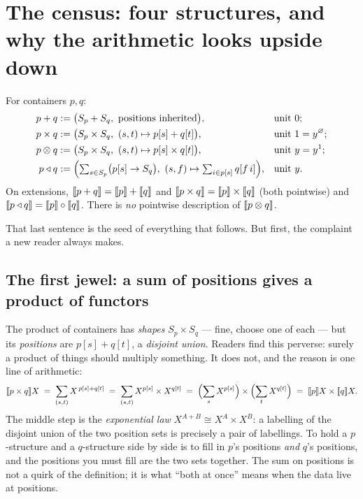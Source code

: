 \section{The census: four structures, and why the arithmetic looks upside down}
\label{sec:census}

\begin{Definition}\label{def:four}
For containers $p,q$:
\begin{align*}
 p + q &:= \bigl(S_p + S_q,\ \text{positions inherited}\bigr),
   &&\text{unit } 0;\\
 p\times q &:= \bigl(S_p\times S_q,\ (s,t)\mapsto p[s] + q[t]\bigr),
   &&\text{unit } 1 = y^{\varnothing};\\
 p\mathbin{\otimes} q &:= \bigl(S_p\times S_q,\ (s,t)\mapsto p[s]\times q[t]\bigr),
   &&\text{unit } y = y^{1};\\
 p\mathbin{\triangleleft} q &:= \Bigl(\textstyle\sum_{s\in S_p}\bigl(p[s]\to S_q\bigr),\
   (s,f)\mapsto \textstyle\sum_{i\in p[s]} q[f\,i]\Bigr),
   &&\text{unit } y .
\end{align*}
On extensions, $\llbracket p+q \rrbracket=\llbracket p \rrbracket+\llbracket q \rrbracket$ and $\llbracket p\times q \rrbracket=\llbracket p \rrbracket\times\llbracket q \rrbracket$
(both pointwise) and $\llbracket p\mathbin{\triangleleft} q \rrbracket=\llbracket p \rrbracket\circ\llbracket q \rrbracket$. There is \emph{no}
pointwise description of $\llbracket p\mathbin{\otimes} q \rrbracket$.
\end{Definition}

That last sentence is the seed of everything that follows. But first, the
complaint a new reader always makes.

\subsection{The first jewel: a sum of positions gives a product of functors}

The product of containers has \emph{shapes} $S_p\times S_q$ --- fine, choose one
of each --- but its \emph{positions} are $p[s]+q[t]$, a \emph{disjoint union}.
Readers find this perverse: surely a product of things should multiply
something. It does not, and the reason is one line of arithmetic:
\[
  \llbracket p\times q \rrbracket X
   \;=\;\sum_{(s,t)} X^{\,p[s]+q[t]}
   \;=\;\sum_{(s,t)} X^{p[s]}\times X^{q[t]}
   \;=\;\Bigl(\sum_s X^{p[s]}\Bigr)\times\Bigl(\sum_t X^{q[t]}\Bigr)
   \;=\;\llbracket p \rrbracket X\times\llbracket q \rrbracket X .
\]
The middle step is the \emph{exponential law} $X^{A+B}\cong X^A\times X^B$: a
labelling of the disjoint union of the two position sets is precisely a pair of
labellings. To hold a $p$-structure and a $q$-structure side by side is to fill
in $p$'s positions \emph{and} $q$'s positions, and the positions you must fill
are the two sets together. The sum on positions is not a quirk of the
definition; it is what ``both at once'' means when the data live at positions.

